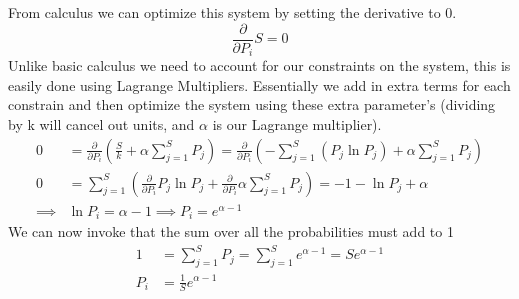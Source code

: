 \documentclass{article}
\begin{document}
From calculus we can optimize this system by setting the derivative to 0. 
\begin{equation}
    \frac{\partial}{\partial P_i}S = 0
\end{equation}
Unlike basic calculus we need to account for our constraints on the system, this is easily done using Lagrange Multipliers. 
Essentially we add in extra terms for each constrain and then optimize the system using these extra parameter's (dividing by k will cancel out units, and $\alpha$ is our Lagrange multiplier). 
\begin{equation}
\begin{split}
    0 &= \frac{\partial}{\partial P_i} \left( \frac{S}{k} + \alpha\sum_{j=1}^S P_j \right) =
     \frac{\partial}{\partial P_i} \left( -\sum_{j=1}^S \left( P_j\ln P_j  \right) + \alpha\sum_{j=1}^S P_j \right) \\
     0 &= \sum_{j=1}^S \left (\frac{\partial}{\partial P_i}   P_j\ln P_j  + \frac{\partial}{\partial P_i}  \alpha\sum_{j=1}^S P_j \right) = -1 -\ln P_j +\alpha \\
     \implies & \ln P_i = \alpha -1 \implies P_i = e^{\alpha - 1}
    \end{split}
\end{equation}
We can now invoke that the sum over all the probabilities must add to 1
\begin{equation}
\begin{split}
1 &= \sum_{j=1}^S P_j = \sum_{j=1}^Se^{\alpha - 1} = S e^{\alpha - 1} \\
P_i &= \frac{1}{S}e^{\alpha -1}
\end{split}
\end{equation}
\end{document}

